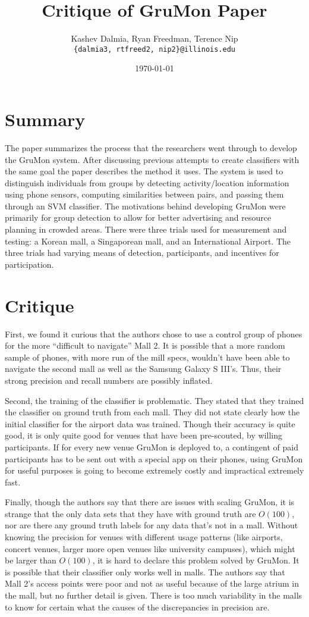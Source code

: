 \documentclass[a4paper]{article}
\title{Critique of GruMon Paper}
\author{Kashev Dalmia, Ryan Freedman, Terence Nip \\
        \texttt{\{dalmia3, rtfreed2, nip2\}@illinois.edu}
       }
\date{\today}
\begin{document}
\maketitle

\section{Summary}
The paper summarizes the process that the researchers went through to develop
the GruMon system. After discussing previous attempts to create classifiers with
the same goal the paper describes the method it uses. The system is used to
distinguish individuals from groups by detecting activity/location information
using phone sensors, computing similarities between pairs, and passing them
through an SVM classifier. The motivations behind developing GruMon were
primarily for group detection to allow for better advertising and resource
planning in crowded areas. There were three trials used for measurement and
testing: a Korean mall, a Singaporean mall, and an International Airport. The
three trials had varying means of detection, participants, and incentives for
participation.

\section{Critique}
First, we found it curious that the authors chose to use a control group of
phones for the more ``difficult to navigate'' Mall 2. It is possible that a more
random sample of phones, with more run of the mill specs, wouldn't have been
able to navigate the second mall as well as the Samsung Galaxy S III's. Thus,
their strong precision and recall numbers are possibly inflated.

Second, the training of the classifier is problematic. They stated that they
trained the classifier on ground truth from each mall. They did not state
clearly how the initial classifier for the airport data was trained. Though
their accuracy is quite good, it is only quite good for venues that have been
pre-scouted, by willing participants. If for every new venue GruMon is deployed
to, a contingent of paid participants has to be sent out with a special app on
their phones, using GruMon for useful purposes is going to become extremely
costly and impractical extremely fast.

Finally, though the authors say that there are issues with scaling GruMon, it is
strange that the only data sets that they have with ground truth are $O(100)$,
nor are there any ground truth labels for any data that's not in a mall. Without
knowing the precision for venues with different usage patterns (like airports,
concert venues, larger more open venues like university campuses), which might
be larger than $O(100)$, it is hard to declare this problem solved by GruMon. It
is possible that their classifier only works well in malls. The authors say that
Mall 2's access points were poor and not as useful because of the large atrium
in the mall, but no further detail is given. There is too much variability in
the malls to know for certain what the causes of the discrepancies in precision
are.
\end{document}
